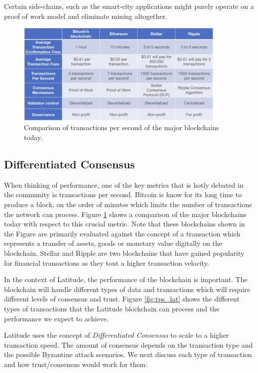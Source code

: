 Certain side-chains, such as the smart-city applications might purely operate on a proof of work model and eliminate
mining altogether.
\begin{figure}[t]
    \centering
    \includegraphics[width=0.90\textwidth]{tps_speed2.png}
  \caption{Comparison of transactions per second of the major blockchains today.}
    \label{fig:tps_speed}
\end{figure}
\subsection{Differentiated Consensus}
When thinking of performance, one of the key metrics that is hotly debated in the community is transactions per second.
Bitcoin is know for its long time to produce a block, on the order of minutes which limits the number of transactions
the network can process. Figure \ref{fig:tps_speed} shows a comparison of the major blockchains today with respect to
this crucial metric. Note that these blockchains shown in the Figure are primarily evaluated against the concept of a
transaction which represents a transfer of assets, goods or monetary value digitally on the blockchain. Stellar and
Ripple are two blockchains that have gained popularity for financial transactions as they tout a higher transaction
velocity. 

In the context of Latitude, the performance of the blockchain is important. The blockchain will handle different types
of data and transactions which will require different levels of consensus and trust. Figure \ref{fig:tps_lat} shows the
different types of transactions that the Latitude blockchain can process and the performance we expect to achieve.

Latitude uses the concept of {\em Differentiated Consensus} to scale to a higher transaction speed. The amount of
consensus depends on the transaction type and the possible Byzantine attack scenarios. We next discuss each type of
transaction and how trust/consensus would work for them:

